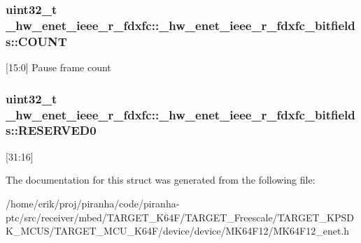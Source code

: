 \subsubsection[{\texorpdfstring{C\+O\+U\+NT}{COUNT}}]{\setlength{\rightskip}{0pt plus 5cm}uint32\+\_\+t \+\_\+hw\+\_\+enet\+\_\+ieee\+\_\+r\+\_\+fdxfc\+::\+\_\+hw\+\_\+enet\+\_\+ieee\+\_\+r\+\_\+fdxfc\+\_\+bitfields\+::\+C\+O\+U\+NT}\hypertarget{struct__hw__enet__ieee__r__fdxfc_1_1__hw__enet__ieee__r__fdxfc__bitfields_a47119fdb8c34d0c6c9e5fb65bd2ef850}{}\label{struct__hw__enet__ieee__r__fdxfc_1_1__hw__enet__ieee__r__fdxfc__bitfields_a47119fdb8c34d0c6c9e5fb65bd2ef850}
\mbox{[}15\+:0\mbox{]} Pause frame count 
\subsubsection[{\texorpdfstring{R\+E\+S\+E\+R\+V\+E\+D0}{RESERVED0}}]{\setlength{\rightskip}{0pt plus 5cm}uint32\+\_\+t \+\_\+hw\+\_\+enet\+\_\+ieee\+\_\+r\+\_\+fdxfc\+::\+\_\+hw\+\_\+enet\+\_\+ieee\+\_\+r\+\_\+fdxfc\+\_\+bitfields\+::\+R\+E\+S\+E\+R\+V\+E\+D0}\hypertarget{struct__hw__enet__ieee__r__fdxfc_1_1__hw__enet__ieee__r__fdxfc__bitfields_a8ff7034ecb48807957e328862081f636}{}\label{struct__hw__enet__ieee__r__fdxfc_1_1__hw__enet__ieee__r__fdxfc__bitfields_a8ff7034ecb48807957e328862081f636}
\mbox{[}31\+:16\mbox{]} 

The documentation for this struct was generated from the following file\+:\begin{DoxyCompactItemize}
\item 
/home/erik/proj/piranha/code/piranha-\/ptc/src/receiver/mbed/\+T\+A\+R\+G\+E\+T\+\_\+\+K64\+F/\+T\+A\+R\+G\+E\+T\+\_\+\+Freescale/\+T\+A\+R\+G\+E\+T\+\_\+\+K\+P\+S\+D\+K\+\_\+\+M\+C\+U\+S/\+T\+A\+R\+G\+E\+T\+\_\+\+M\+C\+U\+\_\+\+K64\+F/device/device/\+M\+K64\+F12/M\+K64\+F12\+\_\+enet.\+h\end{DoxyCompactItemize}
